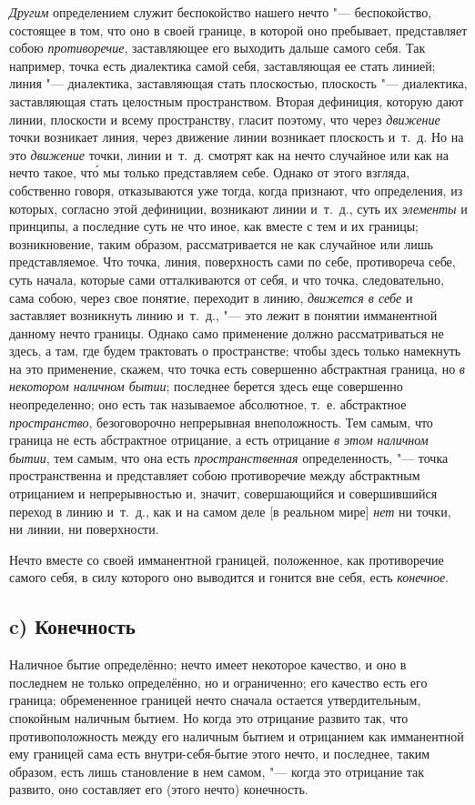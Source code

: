 {\em Другим} определением служит беспокойство нашего
нечто "--- беспокойство, состоящее в том, что оно в своей границе, в которой
оно пребывает, представляет собою {\em противоречие},
заставляющее его выходить дальше самого себя. Так например, точка есть
диалектика самой себя, заставляющая ее стать линией; линия "--- диалектика,
заставляющая стать плоскостью, плоскость "--- диалектика, заставляющая стать
целостным пространством. Вторая дефиниция, которую дают линии, плоскости и
всему пространству, гласит поэтому, что через
{\em движение} точки возникает линия, через движение
линии возникает плоскость и~т.~д. Но на это
{\em движение} точки, линии и~т.~д. смотрят как на
нечто случайное или как на нечто такое, чт\'{о} мы только представляем себе.
Однако от этого взгляда, собственно говоря, отказываются уже тогда, когда
признают, что определения, из которых, согласно этой дефиниции, возникают
линии и~т.~д., суть их {\em элементы} и принципы, а
последние суть не что иное, как вместе с тем и их границы; возникновение,
таким образом, рассматривается не как случайное или лишь представляемое.
Что точка, линия, поверхность сами по себе, противореча себе, суть начала,
которые сами отталкиваются от себя, и что точка, следовательно, сама собою,
через свое понятие, переходит в линию, {\em движется в
себе} и заставляет возникнуть линию и~т.~д., "--- это лежит в понятии
имманентной данному нечто границы. Однако само применение должно
рассматриваться не здесь, а там, где будем трактовать о пространстве; чтобы
здесь только намекнуть на это применение, скажем, что точка есть совершенно
абстрактная граница, но {\em в некотором наличном
бытии}; последнее берется здесь еще совершенно неопределенно; оно есть так
называемое абсолютное, т.~е. абстрактное
{\em пространство}, безоговорочно непрерывная
внеположность. Тем самым, что граница не есть абстрактное отрицание, а есть
отрицание {\em в этом наличном бытии}, тем самым, что
она есть {\em пространственная} определенность, "--- точка
пространственна и представляет собою противоречие между абстрактным
отрицанием и непрерывностью и, значит, совершающийся и совершившийся
переход в линию и~т.~д., как и на самом деле [в реальном мире]
{\em нет} ни точки, ни линии, ни поверхности.

Нечто вместе со своей имманентной границей, положенное, как противоречие
самого себя, в силу которого оно выводится и гонится вне себя, есть
{\em конечное}.

\subsection[c) Конечность]{c) Конечность}
Наличное бытие определённо; нечто имеет некоторое качество, и оно в последнем
не только определённо, но и ограниченно; его качество есть его граница;
обремененное границей нечто сначала остается утвердительным, спокойным
наличным бытием. Но когда это отрицание развито так, что противоположность
между его наличным бытием и отрицанием как имманентной ему границей сама
есть внутри-себя-бытие этого нечто, и последнее, таким образом, есть лишь
становление в нем самом, "--- когда это отрицание так развито, оно составляет
его (этого нечто) конечность.

